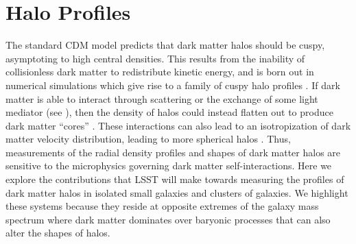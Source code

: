 \section{Halo Profiles} 
\label{sec:profiles}

The standard CDM model predicts that dark matter halos should be cuspy, asymptoting to high central densities.
This results from the inability of collisionless dark matter to redistribute kinetic energy, and is born out in numerical simulations which give rise to a family of cuspy halo profiles \citep[\eg, the NFW profile,][]{Navarro:1996gj}.
If dark matter is able to interact through scattering or the exchange of some light mediator (see ), then the density of halos could instead flatten out to produce dark matter ``cores'' \citep{Spergel:1999mh}.
These interactions can also lead to an isotropization of dark matter velocity distribution, leading to more spherical halos \citep{Peter:2013}.
Thus, measurements of the radial density profiles and shapes of dark matter halos are sensitive to the microphysics governing dark matter self-interactions.
Here we explore the contributions that LSST will make towards measuring the profiles of dark matter halos in isolated small galaxies and clusters of galaxies.
We highlight these systems because they reside at opposite extremes of the galaxy mass spectrum where dark matter dominates over baryonic processes that can also alter the shapes of halos.



% 
% 

